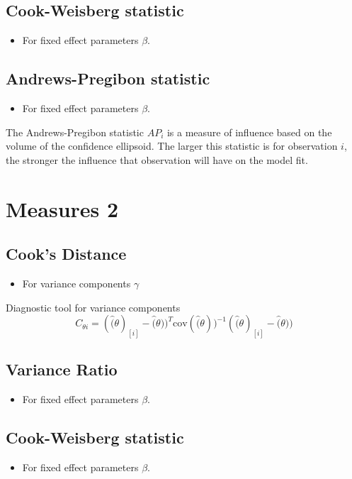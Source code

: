 \documentclass[12pt, a4paper]{report}
\begin{document}
\subsection{Cook-Weisberg statistic} %
\begin{itemize}
	\item For fixed effect parameters $\beta$.
\end{itemize}


\subsection{Andrews-Pregibon statistic} %
\begin{itemize}
	\item For fixed effect parameters $\beta$.
\end{itemize}
The Andrews-Pregibon statistic $AP_{i}$ is a measure of influence based on the volume of the confidence ellipsoid.
The larger this statistic is for observation $i$, the stronger the influence that observation will have on the model fit.


\newpage
\section{Measures 2} %

\subsection{Cook's Distance} %
\begin{itemize}
	\item For variance components $\gamma$
\end{itemize}

Diagnostic tool for variance components
\[ C_{\theta i} =(\hat(\theta)_{[i]} - \hat(\theta))^{T}\mbox{cov}( \hat(\theta))^{-1}(\hat(\theta)_{[i]} - \hat(\theta))\]

\subsection{Variance Ratio} %
\begin{itemize}
	\item For fixed effect parameters $\beta$.
\end{itemize}

\subsection{Cook-Weisberg statistic} %
\begin{itemize}
	\item For fixed effect parameters $\beta$.
\end{itemize}
\end{document}
